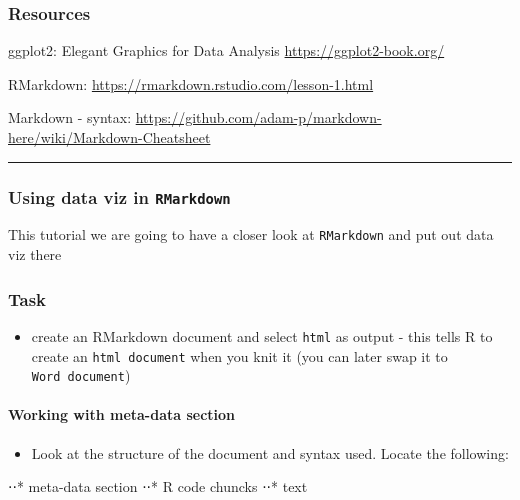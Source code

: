 \documentclass[
]{article}
\providecommand{\tightlist}{%
  \setlength{\itemsep}{0pt}\setlength{\parskip}{0pt}}
\begin{document}
\hypertarget{resources}{%
\subsubsection{Resources}\label{resources}}

ggplot2: Elegant Graphics for Data Analysis
\url{https://ggplot2-book.org/}

RMarkdown: \url{https://rmarkdown.rstudio.com/lesson-1.html}

Markdown - syntax:
\url{https://github.com/adam-p/markdown-here/wiki/Markdown-Cheatsheet}

\begin{center}\rule{0.5\linewidth}{0.5pt}\end{center}

\hypertarget{using-data-viz-in-rmarkdown}{%
\subsubsection{\texorpdfstring{Using data viz in
\texttt{RMarkdown}}{Using data viz in RMarkdown}}\label{using-data-viz-in-rmarkdown}}

This tutorial we are going to have a closer look at \texttt{RMarkdown}
and put out data viz there

\hypertarget{task}{%
\subsubsection{Task}\label{task}}

\begin{itemize}
\tightlist
\item
  create an RMarkdown document and select \texttt{html} as output - this
  tells R to create an \texttt{html\ document} when you knit it (you can
  later swap it to \texttt{Word\ document})
\end{itemize}

\hypertarget{working-with-meta-data-section}{%
\paragraph{Working with meta-data
section}\label{working-with-meta-data-section}}

\begin{itemize}
\tightlist
\item
  Look at the structure of the document and syntax used. Locate the
  following:
\end{itemize}

⋅⋅* meta-data section ⋅⋅* R code chuncks ⋅⋅* text
\end{document}
